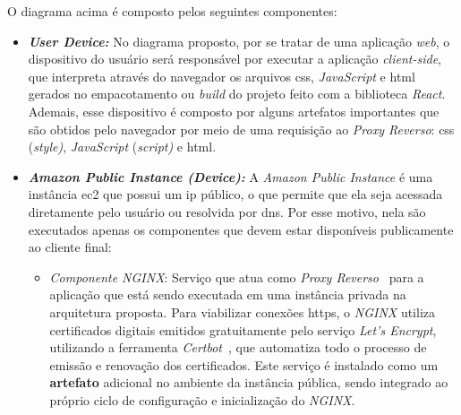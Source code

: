 O diagrama acima é composto pelos seguintes componentes:
\begin{itemize}
  \item \textbf{\textit{User Device:}} No diagrama proposto, por se tratar de uma aplicação \emph{web}, o dispositivo do usuário será responsável por executar a aplicação \textit{client-side}, que interpreta através do navegador os arquivos \gls{css}, \emph{JavaScript} e \gls{html} gerados no empacotamento ou \textit{build} do projeto feito com a biblioteca \emph{React}. Ademais, esse dispositivo é composto por alguns artefatos importantes que são obtidos pelo navegador por meio de uma requisição ao \textit{Proxy Reverso}: \gls{css} (\emph{style)}, \emph{JavaScript} (\emph{script)} e \gls{html}.

  \item \textbf{\textit{Amazon Public Instance (Device):}} A \textit{Amazon Public Instance} é uma instância \gls{ec2} que possui um \gls{ip} público, o que permite que ela seja acessada diretamente pelo usuário ou resolvida por \gls{dns}. Por esse motivo, nela são executados apenas os componentes que devem estar disponíveis publicamente ao cliente final:
    \begin{itemize}
      \item \textit{Componente NGINX}: Serviço que atua como \textit{Proxy Reverso}~\cite{NGINXDocs} para a aplicação que está sendo executada em uma instância privada na arquitetura proposta. Para viabilizar conexões \gls{https}, o \emph{NGINX} utiliza certificados digitais emitidos gratuitamente pelo serviço \emph{Let's Encrypt}, utilizando a ferramenta \emph{Certbot}~\cite{LetsEncryptWithCertbot}, que automatiza todo o processo de emissão e renovação dos certificados. Este serviço é instalado como um \textbf{artefato} adicional no ambiente da instância pública, sendo integrado ao próprio ciclo de configuração e inicialização do \emph{NGINX}.
    \end{itemize}


\end{itemize}
